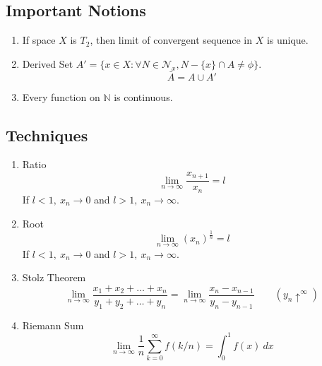 \subsection{Important Notions}
\begin{enumerate}
	\item If space $X$ is $T_2$, then limit of convergent sequence in $X$ is unique.
	\item Derived Set $A' = \{ x \in X : \forall N \in \mathcal{N}_x, N-\{x\} \cap A \ne \phi \}$.
		\[ \bar{A} = A \cup A' \]
	\item Every function on $\mathbb{N}$ is continuous.
\end{enumerate}

\subsection{Techniques}
\begin{enumerate}
	\item Ratio
		\[ \lim_{n \to \infty} \frac{x_{n+1}}{x_n} = l \]
		If $l < 1,\ x_n \to 0$ and $l > 1,\ x_n \to \infty$.
	\item Root
		\[ \lim_{n \to \infty} (x_n)^{\frac{1}{n}} = l \]
		If $l < 1,\ x_n \to 0$ and $l > 1,\ x_n \to \infty$.
	\item Stolz Theorem
		\[ \lim_{n \to \infty} \frac{x_1+x_2+\dots+x_n}{y_1+y_2+\dots+y_n} = \lim_{n \to \infty} \frac{x_n-x_{n-1}}{y_n-y_{n-1}} \qquad (y_n \uparrow^\infty) \]
	\item Riemann Sum
		\[ \lim_{n \to \infty} \frac{1}{n} \sum_{k=0}^\infty f(k/n) = \int_0^1 f(x)\ dx \]
\end{enumerate}


